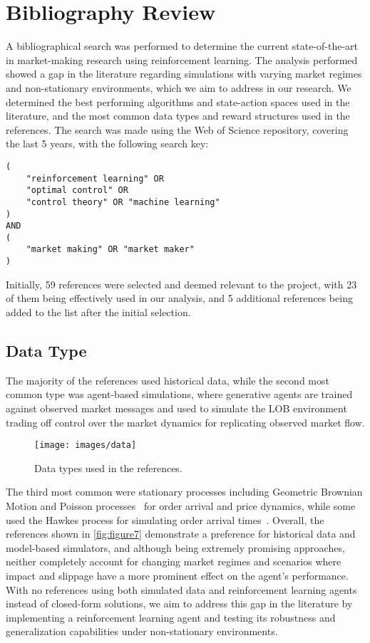 \section{Bibliography Review}
\label{sec:bibliography-review}

A bibliographical search was performed to determine the current state-of-the-art in market-making research using reinforcement learning.
The analysis performed showed a gap in the literature regarding simulations with varying market regimes and non-stationary environments,
which we aim to address in our research.
We determined the best performing algorithms and state-action spaces used in the literature,
and the most common data types and reward structures used in the references.
The search was made using the Web of Science repository, covering the last 5 years, with the following search key:
\small
\begin{verbatim}
(
    "reinforcement learning" OR
    "optimal control" OR
    "control theory" OR "machine learning"
)
AND
(
    "market making" OR "market maker"
)
\end{verbatim}

Initially, 59 references were selected and deemed relevant to the project,
with 23 of them being effectively used in our analysis, and 5 additional references being added to the list after the initial selection.

\subsection{Data Type}
\label{subsec:data-type}
The majority of the references used historical data, while the second most common type was agent-based simulations,
where generative agents are trained against observed market messages and used to simulate the LOB environment~\cite{Frey2023, Ganesh2019}
trading off control over the market dynamics for replicating observed market flow.

\begin{figure}
    \centering
    \texttt{[image: images/data]}
    \caption{Data types used in the references.}
    \label{fig:figure7}
\end{figure}

The third most common were stationary processes including Geometric Brownian Motion and Poisson processes~\cite{Gasperov2021, Sun2022} for
order arrival and price dynamics, while some used the Hawkes process for simulating order arrival times~\cite{Jerome2022, Selser2021}.
Overall, the references shown in \autoref{fig:figure7} demonstrate a preference for historical data and model-based simulators,
and although being extremely promising approaches, neither completely account for changing market regimes and scenarios where impact and
slippage have a more prominent effect on the agent's performance.
With no references using both simulated data and reinforcement learning agents instead of closed-form solutions,
we aim to address this gap in the literature by implementing a reinforcement learning agent and testing its robustness and generalization capabilities under non-stationary environments.

